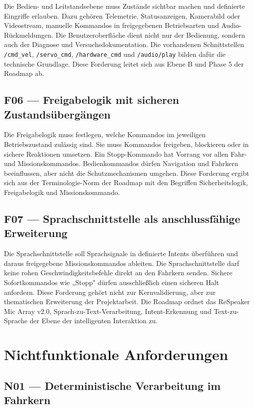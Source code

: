 Die Bedien- und Leitstandsebene muss Zustände sichtbar machen und definierte Eingriffe erlauben. Dazu gehören Telemetrie, Statusanzeigen, Kamerabild oder Videostream, manuelle Kommandos in freigegebenen Betriebsarten und Audio-Rückmeldungen. Die Benutzeroberfläche dient nicht nur der Bedienung, sondern auch der Diagnose und Versuchsdokumentation. Die vorhandenen Schnittstellen \texttt{/cmd\_vel}, \texttt{/servo\_cmd}, \texttt{/hardware\_cmd} und \texttt{/audio/play} bilden dafür die technische Grundlage. Diese Forderung leitet sich aus Ebene B und Phase 5 der Roadmap ab.

\subsection{F06 — Freigabelogik mit sicheren Zustandsübergängen}

Die Freigabelogik muss festlegen, welche Kommandos im jeweiligen Betriebszustand zulässig sind. Sie muss Kommandos freigeben, blockieren oder in sichere Reaktionen umsetzen. Ein Stopp-Kommando hat Vorrang vor allen Fahr- und Missionskommandos. Bedienkommandos dürfen Navigation und Fahrkern beeinflussen, aber nicht die Schutzmechanismen umgehen. Diese Forderung ergibt sich aus der Terminologie-Norm der Roadmap mit den Begriffen Sicherheitslogik, Freigabelogik und Missionskommando.

\subsection{F07 — Sprachschnittstelle als anschlussfähige Erweiterung}

Die Sprachschnittstelle soll Sprachsignale in definierte Intents überführen und daraus freigegebene Missionskommandos ableiten. Die Sprachschnittstelle darf keine rohen Geschwindigkeitsbefehle direkt an den Fahrkern senden. Sichere Sofortkommandos wie „Stopp" dürfen ausschließlich einen sicheren Halt anfordern. Diese Forderung gehört nicht zur Kernvalidierung, aber zur thematischen Erweiterung der Projektarbeit. Die Roadmap ordnet das ReSpeaker Mic Array v2.0, Sprach-zu-Text-Verarbeitung, Intent-Erkennung und Text-zu-Sprache der Ebene der intelligenten Interaktion zu.

\section{Nichtfunktionale Anforderungen}

\subsection{N01 — Deterministische Verarbeitung im Fahrkern}

